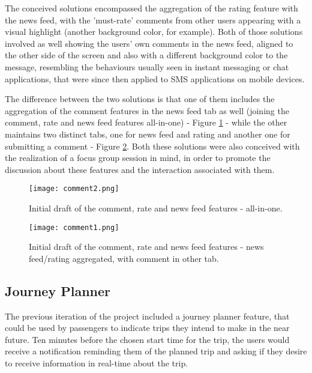 The conceived solutions encompassed the aggregation of the rating feature with the news feed, with the 'must-rate' comments from other users appearing with a visual highlight (another background color, for example).
Both of those solutions involved as well showing the users' own comments in the news feed, aligned to the other side of the screen and also with a different background color to the message, resembling the behaviours usually seen in instant messaging or chat applications, that were since then applied to SMS applications on mobile devices.

The difference between the two solutions is that one of them includes the aggregation of the comment features in the news feed tab as well (joining the comment, rate and news feed features all-in-one) - Figure \ref{fig:comment2} - while the other maintains two distinct tabs, one for news feed and rating and another one for submitting a comment - Figure \ref{fig:comment1}. 
Both these solutions were also conceived with the realization of a focus group session in mind, in order to promote the discussion about these features and the interaction associated with them.

\clearpage

\begin{figure}[h!]
  \begin{center}
    \leavevmode
    \texttt{[image: comment2.png]}
    \caption{Initial draft of the comment, rate and news feed features - all-in-one.}
    \label{fig:comment2}
  \end{center}
\end{figure}

\begin{figure}[h!]
  \begin{center}
    \leavevmode
    \texttt{[image: comment1.png]}
    \caption{Initial draft of the comment, rate and news feed features - news feed/rating aggregated, with comment in other tab.}
    \label{fig:comment1}
  \end{center}
\end{figure}

\subsection{Journey Planner}\label{jourplaninit}

The previous iteration of the project included a journey planner feature, that could be used by passengers to indicate trips they intend to make in the near future. Ten minutes before the chosen start time for the trip, the users would receive a notification reminding them of the planned trip and asking if they desire to receive information in real-time about the trip.

